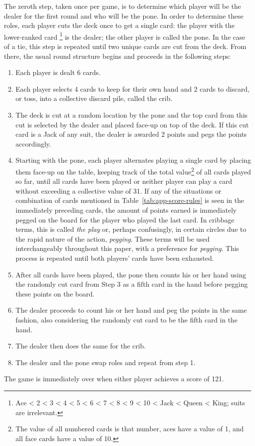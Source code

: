 The zeroth step, taken once per game, is to determine which player will be the
dealer for the first round and who will be the pone.
%
In order to determine these roles,
each player cuts the deck once to get a single card:
the player with the lower-ranked card%
\footnote{Ace < 2 < 3 < 4 < 5 < 6 < 7 < 8 < 9 < 10 < Jack < Queen < King;
suits are irrelevant.}
is the dealer;
the other player is called the pone.
In the case of a tie, this step is repeated until two unique cards are
cut from the deck.
%
From there, the usual round structure begins and proceeds in the following
steps:
%
\begin{enumerate} %
%
\item Each player is dealt 6 cards.
%
\item Each player selects 4 cards to keep for their own hand and 2 cards to
	discard, or toss, into a collective discard pile, called the crib.
%
\item The deck is cut at a random location by the pone
	and the top card from this cut is selected by the dealer and placed
	face-up on top of the deck.
	If this cut card is a Jack of any suit,
	the dealer is awarded 2 points and pegs the points accordingly.
%
\item Starting with the pone, each player alternates playing a single card
	by placing them face-up on the table,
	keeping track of the total value\footnote{
		The value of all numbered cards is that number, aces have
		a value of 1, and all face cards have a value of 10.
	}
	of all cards played so far,
	until all cards have been played
	or neither player can play a card without exceeding a collective value of
	31.
	If any of the situations or combination of cards mentioned in
	Table~\ref{tab:app-score-rules} is seen in the immediately preceding cards,
	the amount of points earned is immediately pegged on the board for the
	player who played the last card.
	In cribbage terms, this is called \textit{the play}
	or, perhaps confusingly,
	in certain circles due to the rapid nature of the
	action, \textit{pegging}.
	These terms will be used interchangeably throughout this paper,
	with a preference for \textit{pegging}.
	This process is repeated until both players' cards have been exhausted.
%
\item After all cards have been played,
	the pone then counts his or her hand
	using the randomly cut card from Step 3 as a
	fifth card in the hand before pegging these points on the board.
%
\item The dealer proceeds to count his or her hand and peg the points
	in the same fashion, also considering the randomly cut card to be the
	fifth card in the hand.
%
\item The dealer then does the same for the crib.
%
\item The dealer and the pone swap roles and repeat from step 1.
%
\end{enumerate}
%
The game is immediately over when either player achieves a score
of 121.



